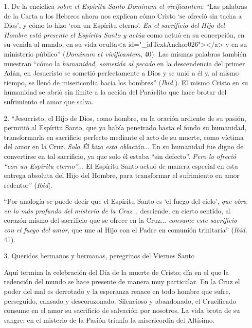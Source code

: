 			\begin{body}1. De la encíclica \textit{sobre el Espíritu Santo} \textit{Dominum et vivificantem}: “Las palabras de la Carta a los Hebreos ahora nos explican cómo Cristo ‘se ofreció sin tacha a Dios’, y cómo lo hizo ‘con un Espíritu eterno’. \textit{En el sacrificio del Hijo del Hombre está presente el Espíritu Santo y actúa} como actuó en su concepción, en su venida al mundo, en su vida oculta<a id="_idTextAnchor026"></a> y en su ministerio público” (\textit{Dominum et vivificantem}, 40). Las mismas palabras también muestran “cómo la \textit{humanidad, sometida al pecado} en la descendencia del primer Adán, en Jesucristo se sometió perfectamente a Dios y se unió a él y, al mismo tiempo, se llenó de misericordia hacia los hombres” (\textit{Ibid.}). El mismo Cristo en su humanidad se abrió sin límite a la acción del Paráclito que hace brotar del sufrimiento el amor que salva. \end{body}
			
			\begin{body}2. “Jesucristo, el Hijo de Dios, como hombre, en la oración ardiente de su pasión, permitió al Espíritu Santo, que ya había penetrado hasta el fondo su humanidad, transformarla en sacrificio perfecto mediante el acto de su muerte, como víctima del amor en la Cruz. \textit{Solo Él hizo esta oblación}... En su humanidad fue digno de convertirse en tal sacrificio, ya que solo él estaba “sin defecto”. \textit{Pero lo ofreció “con un Espíritu eterno”}... El Espíritu Santo actuó de manera especial en esta entrega absoluta del Hijo del Hombre, para transformar el sufrimiento en amor redentor” (\textit{Ibid}). \end{body}
			
			\begin{body}“Por analogía se puede decir que el Espíritu Santo es ‘el fuego del cielo’, \textit{que obra en lo más profundo del misterio de la Cruz}... desciende, en cierto sentido, al corazón mismo del sacrificio que se ofrece en la Cruz... \textit{consume este sacrificio con el fuego del amor}, que une al Hijo con el Padre en comunión trinitaria” (\textit{Ibíd}. 41). \end{body}
			
			\begin{body}3. Queridos hermanos y hermanas, peregrinos del Viernes Santo \begin{bodysmall} \end{bodysmall} Aquí termina la celebración del Día de la muerte de Cristo; día en el que la redención del mundo se hace presente de manera muy particular. En la Cruz el poder del mal es derrotado y la esperanza renace en todo hombre que sufre, perseguido, cansado y descorazonado. Silencioso y abandonado, el Crucificado consume en el amor su sacrificio de salvación por nosotros. La vida brota de su sangre; en el misterio de la Pasión triunfa la misericordia del Altísimo. \end{body}
			
